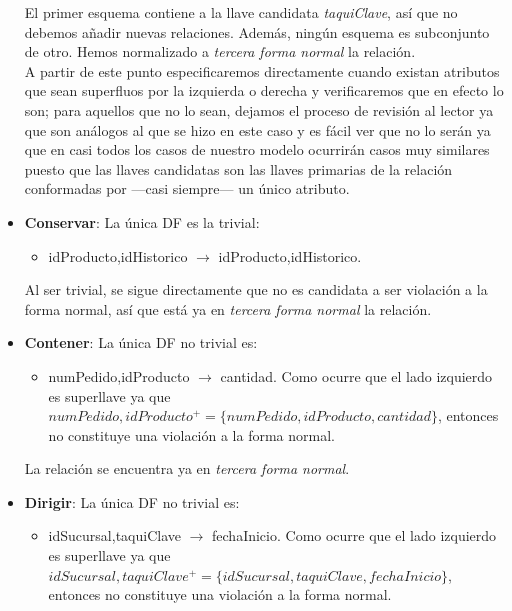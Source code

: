 \documentclass[11pt,letterpaper]{article}
\begin{document}
\begin{itemize}
El primer esquema contiene a la llave candidata \textit{taquiClave}, así que no debemos añadir nuevas relaciones. Además, ningún esquema es subconjunto de otro. Hemos normalizado a \textit{tercera forma normal} la relación. \\

A partir de este punto especificaremos directamente cuando existan atributos que sean superfluos por la izquierda o derecha y verificaremos que en efecto lo son; para aquellos que no lo sean, dejamos el proceso de revisión al lector ya que son análogos al que se hizo en este caso y es fácil ver que no lo serán ya que en casi todos los casos de nuestro modelo ocurrirán casos muy similares puesto que las llaves candidatas son las llaves primarias de la relación conformadas por ---casi siempre--- un único atributo. 


\item \textbf{Conservar}: La única DF es la trivial:

\begin{itemize}
\item idProducto,idHistorico $\rightarrow$ idProducto,idHistorico.
\end{itemize}

Al ser trivial, se sigue directamente que no es candidata a ser violación a la forma normal, así que está ya en \textit{tercera forma normal} la relación. 

\item \textbf{Contener}: La única DF no trivial es:

\begin{itemize}
\item numPedido,idProducto $\rightarrow$ cantidad. Como ocurre que el lado izquierdo es superllave ya que\\ $numPedido,idProducto^+=\{numPedido,idProducto,cantidad\}$, entonces no constituye una violación a la forma normal.
\end{itemize}

La relación se encuentra ya en \textit{tercera forma normal}.


\item \textbf{Dirigir}: La única DF no trivial es:

\begin{itemize}
\item idSucursal,taquiClave $\rightarrow$ fechaInicio. Como ocurre que el lado izquierdo es superllave ya que\\ $idSucursal,taquiClave^+=\{idSucursal,taquiClave,fechaInicio\}$, entonces no constituye una violación a la forma normal.
\end{itemize}


\end{itemize}
\end{document}
